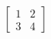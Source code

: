 \documentclass[preview]{standalone}
\begin{document}
\begin{align*}
\begin{bmatrix} 1 & 2 \\ 3 & 4 \end{bmatrix}
\end{align*}
\end{document}
